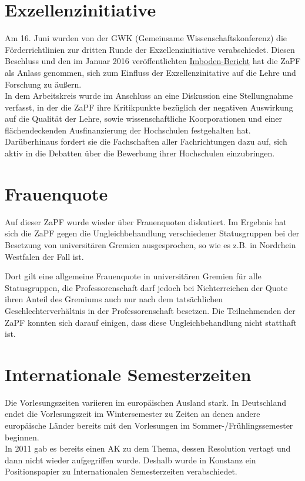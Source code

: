 \section*{Exzellenzinitiative}
Am 16. Juni wurden von der GWK (Gemeinsame Wissenschaftskonferenz) die Förderrichtlinien zur dritten Runde der Exzellenzinitiative verabschiedet. Diesen Beschluss und den im Januar 2016 veröffentlichten \href{http://www.gwk-bonn.de/fileadmin/Papers/Imboden-Bericht-2016.pdf}{\url{Imboden-Bericht}} hat die ZaPF als Anlass genommen, sich zum Einfluss der Exzellenzinitative auf die Lehre und Forschung zu äußern. \\
In dem Arbeitskreis wurde im Anschluss an eine Diskussion eine Stellungnahme verfasst, in der die ZaPF ihre Kritikpunkte bezüglich der negativen Auswirkung auf die Qualität der Lehre, sowie wissenschaftliche Koorporationen und einer flächendeckenden Ausfinanzierung der Hochschulen festgehalten hat. Darüberhinaus fordert sie die Fachschaften aller Fachrichtungen dazu auf, sich aktiv in die Debatten über die Bewerbung ihrer Hochschulen einzubringen. 

\section*{Frauenquote}

Auf dieser ZaPF wurde wieder über Frauenquoten diskutiert. Im Ergebnis hat sich die ZaPF gegen die Ungleichbehandlung verschiedener Statusgruppen bei der Besetzung von universitären Gremien ausgesprochen, so wie es z.B. in Nordrhein Westfalen der Fall ist. 

Dort gilt eine allgemeine Frauenquote in universitären Gremien für alle Statusgruppen, die  Professorenschaft darf jedoch bei Nichterreichen der Quote ihren Anteil des Gremiums auch nur nach dem tatsächlichen Geschlechterverhältnis in der Professorenschaft besetzen. Die Teilnehmenden der ZaPF konnten sich darauf einigen, dass diese Ungleichbehandlung nicht statthaft ist.

\section*{Internationale Semesterzeiten}
Die Vorlesungszeiten variieren im europäischen Ausland stark. In Deutschland endet die Vorlesungszeit im Wintersemester zu Zeiten an denen andere europäische Länder bereits mit den Vorlesungen im Sommer-/Frühlingssemester beginnen. \\
In 2011 gab es bereits einen AK zu dem Thema, dessen Resolution vertagt und dann nicht wieder aufgegriffen wurde. Deshalb wurde in Konstanz ein Positionspapier zu Internationalen Semesterzeiten verabschiedet.

